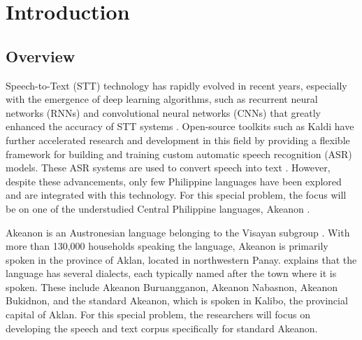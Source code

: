 \chapter{Introduction}
\label{sec:researchdesc}    %

\section{Overview}
\label{sec:overview}

Speech-to-Text (STT) technology has rapidly evolved in recent years, especially with the emergence of deep learning algorithms, such as recurrent neural networks (RNNs) and convolutional neural networks (CNNs) that greatly enhanced the accuracy of STT systems \cite{Televic:2024}. Open-source toolkits such as Kaldi have further accelerated research and development in this field by providing a flexible framework for building and training custom automatic speech recognition (ASR) models. These ASR systems are used to convert speech into text . However, despite these advancements, only few Philippine languages have been explored and are integrated with this technology. For this special problem, the focus will be on one of the understudied Central Philippine languages, Akeanon \cite{Wellstood:2022}. 

Akeanon is an Austronesian language belonging to the Visayan subgroup \cite{Biray:2023}. With more than 130,000 households \cite{PSA:2023} speaking the language, Akeanon is primarily spoken in the province of Aklan, located in northwestern Panay.  explains that the language has several dialects, each typically named after the town where it is spoken. These include Akeanon Buruangganon, Akeanon Nabasnon, Akeanon Bukidnon, and the standard Akeanon, which is spoken in Kalibo, the provincial capital of Aklan. For this special problem, the researchers will focus on developing the speech and text corpus specifically for standard Akeanon.

